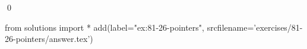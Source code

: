 
\begin{ex}
  \label{ex:81-26-pointers}
  
  \qed
\end{ex}
\begin{python0}
from solutions import *
add(label="ex:81-26-pointers",
    srcfilename='exercises/81-26-pointers/answer.tex')
\end{python0}
